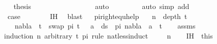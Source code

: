 \begin{isabellebody}
\ \isamarkupfalse%
\ {\isacharquery}{\kern0pt}thesis\ \isanewline
\ \ \ \ \ \ \ \ \ \ \ \isamarkupfalse%
\ {}\ {}{\isacharparenleft}{\kern0pt}{}{\isacharcomma}{\kern0pt}{}{\isacharcomma}{\kern0pt}{}{\isacharcomma}{\kern0pt}{}{\isacharparenright}{\kern0pt}\ \isamarkupfalse%
\ auto\isanewline
\ \ \ \ \ \ \ \isamarkupfalse%
\ {\isacharparenleft}{\kern0pt}auto\ simp\ add{\isacharcolon}{\kern0pt}\ {}{\isacharparenright}{\kern0pt}\isanewline
\ \ \ \ \ \isamarkupfalse%
\isanewline
\ \ \ \isamarkupfalse%
\isanewline
\ \ \ \isamarkupfalse%
\ \isamarkupfalse%
\ {\isacharquery}{\kern0pt}case\ \isanewline
\ \ \ \ \ \isamarkupfalse%
\ IH{\isacharparenleft}{\kern0pt}{}{\isacharcomma}{\kern0pt}{}{\isacharparenright}{\kern0pt}\ \isamarkupfalse%
\ blast\isanewline
\ \isamarkupfalse%
%
\endisatagproof
{\isafoldproof}%
%
\isadelimproof
\isanewline
%
\endisadelimproof
\isanewline
{}\isamarkupfalse%
\ pi{\isacharunderscore}{\kern0pt}right{\isacharunderscore}{\kern0pt}equ{\isacharunderscore}{\kern0pt}help{\isacharcolon}{\kern0pt}\isanewline
\ \ \ {\isachardoublequoteopen}{\isacharparenleft}{\kern0pt}n\ {\isacharequal}{\kern0pt}\ depth\ t{\isacharparenright}{\kern0pt}{\isachardoublequoteclose}\isanewline
\ \ \ {\isachardoublequoteopen}nabla\ {\isasymturnstile}\ t\ {\isasymapprox}\ swap\ pi\ t\ {\isasymLongrightarrow}\ {\isasymforall}\ a\ {\isasymin}\ ds\ {\isacharbrackleft}{\kern0pt}{\isacharbrackright}{\kern0pt}\ pi{\isachardot}{\kern0pt}\ nabla\ {\isasymturnstile}\ a\ {\isasymsharp}\ t{\isachardoublequoteclose}\isanewline
%
\isadelimproof
\ \ %
\endisadelimproof
%
\isatagproof
{}\isamarkupfalse%
\ assms\ \isanewline
{}\isamarkupfalse%
{\isacharparenleft}{\kern0pt}induction\ n\ arbitrary{\isacharcolon}{\kern0pt}\ t\ pi\ rule{\isacharcolon}{\kern0pt}\ nat{\isacharunderscore}{\kern0pt}less{\isacharunderscore}{\kern0pt}induct{\isacharparenright}{\kern0pt}\isanewline
\ \ \isamarkupfalse%
\ {\isacharparenleft}{\kern0pt}{}\ n{\isacharparenright}{\kern0pt}\isanewline
\ \ \isamarkupfalse%
\ IH\ {\isacharequal}{\kern0pt}\ this\isanewline
\ \ \isamarkupfalse%
\ \isamarkupfalse%

\end{isabellebody}
